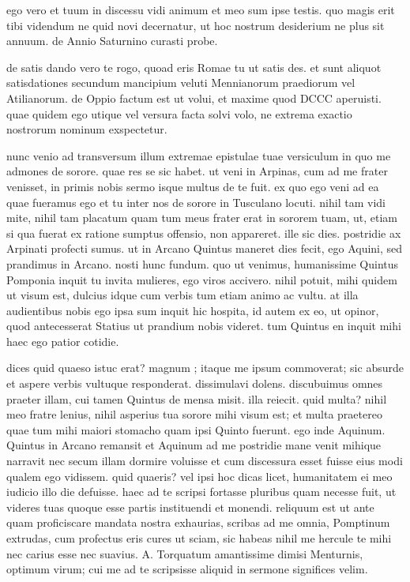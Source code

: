 


 ego vero et tuum in discessu vidi animum et meo sum ipse testis. quo magis erit tibi videndum ne quid novi decernatur, ut hoc nostrum desiderium ne plus sit annuum. de Annio Saturnino curasti probe.

 de satis dando vero te rogo, quoad eris Romae tu ut satis des. et sunt aliquot satisdationes secundum mancipium veluti Mennianorum praediorum vel Atilianorum. de Oppio factum est ut volui, et maxime quod DCCC aperuisti. quae quidem ego utique vel versura facta solvi volo, ne extrema exactio nostrorum nominum exspectetur.

 nunc venio ad transversum illum extremae epistulae tuae versiculum in quo me admones de sorore. quae res se sic habet. ut veni in Arpinas, cum ad me frater venisset, in primis nobis sermo isque multus de te fuit. ex quo ego veni ad ea quae fueramus ego et tu inter nos de sorore in Tusculano locuti. nihil tam vidi mite, nihil tam placatum quam tum meus frater erat in sororem tuam, ut, etiam si qua fuerat ex ratione sumptus offensio, non appareret. ille sic dies. postridie ax Arpinati profecti sumus. ut in Arcano Quintus maneret dies fecit, ego Aquini, sed prandimus in Arcano. nosti hunc fundum. quo ut venimus, humanissime Quintus Pomponia inquit tu invita mulieres, ego viros accivero. nihil potuit, mihi quidem ut visum est, dulcius idque cum verbis tum etiam animo ac vultu. at illa audientibus nobis ego ipsa sum inquit hic hospita, id autem ex eo, ut opinor, quod antecesserat Statius ut prandium nobis videret. tum Quintus en inquit mihi haec ego patior cotidie.

 dices quid quaeso istuc erat? magnum ; itaque me ipsum commoverat; sic absurde et aspere verbis vultuque responderat. dissimulavi dolens. discubuimus omnes praeter illam, cui tamen Quintus de mensa misit. illa reiecit. quid multa? nihil meo fratre lenius, nihil asperius tua sorore mihi visum est; et multa praetereo quae tum mihi maiori stomacho quam ipsi Quinto fuerunt. ego inde Aquinum. Quintus in Arcano remansit et Aquinum ad me postridie mane venit mihique narravit nec secum illam dormire voluisse et cum discessura esset fuisse eius modi qualem ego vidissem. quid quaeris? vel ipsi hoc dicas licet, humanitatem ei meo iudicio illo die defuisse. haec ad te scripsi fortasse pluribus quam necesse fuit, ut videres tuas quoque esse partis instituendi et monendi. reliquum est ut ante quam proficiscare mandata nostra exhaurias, scribas ad me omnia, Pomptinum extrudas, cum profectus eris cures ut sciam, sic habeas nihil me hercule te mihi nec carius esse nec suavius. A. Torquatum amantissime dimisi Menturnis, optimum virum; cui me ad te scripsisse aliquid in sermone significes velim.
